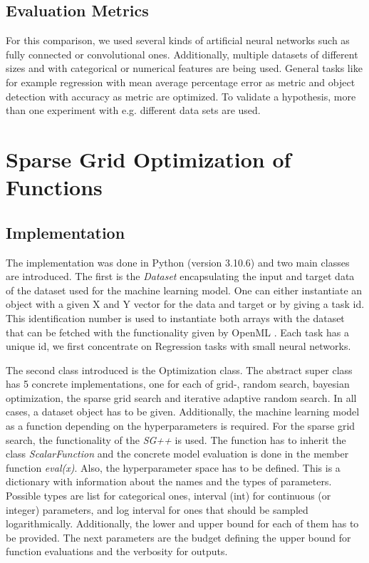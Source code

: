 \subsection{Evaluation Metrics}

For this comparison, we used several kinds of artificial neural networks such as fully connected or convolutional ones. Additionally, multiple datasets of different sizes and with categorical or numerical features are being used. General tasks like for example regression with mean average percentage error as metric and object detection with accuracy as metric are optimized. To validate a hypothesis, more than one experiment with e.g. different data sets are used. 

\section{Sparse Grid Optimization of Functions}

\subsection{Implementation}
\label{subsec:Implementation}

The implementation was done in Python (version 3.10.6) and two main classes are introduced. The first is the \textit{Dataset} encapsulating the input and target data of the dataset used for the machine learning model. One can either instantiate an object with a given X and Y vector for the data and target or by giving a task id. This identification number is used to instantiate both arrays with the dataset that can be fetched with the functionality given by OpenML \cite{feurer-arxiv19a}. Each task has a unique id, we first concentrate on Regression tasks with small neural networks. \newline

The second class introduced is the Optimization class. The abstract super class has 5 concrete implementations, one for each of grid-, random search, bayesian optimization, the sparse grid search and iterative adaptive random search. In all cases, a dataset object has to be given. Additionally, the machine learning model as a function depending on the hyperparameters is required. For the sparse grid search, the functionality of the \textit{SG++} \cite{valentin2016hierarchical} is used. The function has to inherit the class \textit{ScalarFunction} and the concrete model evaluation is done in the member function \textit{eval(x)}. Also, the hyperparameter space has to be defined. This is a dictionary with information about the names and the types of parameters. Possible types are list for categorical ones, interval (int) for continuous (or integer) parameters, and log interval for ones that should be sampled logarithmically. Additionally, the lower and upper bound for each of them has to be provided. The next parameters are the budget defining the upper bound for function evaluations and the verbosity for outputs. \newline

